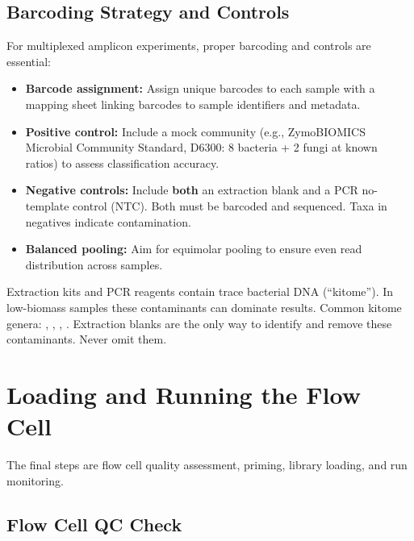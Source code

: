 \subsection{Barcoding Strategy and Controls}
\label{subsec:protocols:barcoding}

For multiplexed amplicon experiments, proper barcoding and controls are essential:

\begin{itemize}[nosep]
  \item \textbf{Barcode assignment:} Assign unique barcodes to each sample with a mapping sheet linking barcodes to sample identifiers and metadata.
  \item \textbf{Positive control:} Include a mock community (e.g., ZymoBIOMICS Microbial Community Standard, D6300: 8 bacteria + 2 fungi at known ratios) to assess classification accuracy.
  \item \textbf{Negative controls:} Include \textbf{both} an extraction blank and a \acrshort{PCR} no-template control (NTC). Both must be barcoded and sequenced. Taxa in negatives indicate contamination.
  \item \textbf{Balanced pooling:} Aim for equimolar pooling to ensure even read distribution across samples.
\end{itemize}
\begin{warningbox}[title={The ``Kitome'' Problem}]
Extraction kits and \acrshort{PCR} reagents contain trace bacterial DNA (``kitome''). In low-biomass samples these contaminants can dominate results. Common kitome genera: , , , . Extraction blanks are the only way to identify and remove these contaminants. Never omit them.
\end{warningbox}

\section{Loading and Running the Flow Cell}
\label{sec:protocols:flowcell}

The final steps are flow cell quality assessment, priming, library loading, and run monitoring.

\subsection{Flow Cell QC Check}
\label{subsec:protocols:flowcell_qc}

